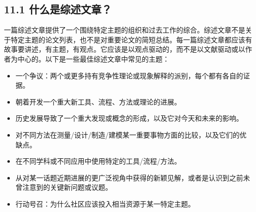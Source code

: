 \subsection*{11.1 什么是综述文章？}
一篇综述文章提供了一个围绕特定主题的组织和过去工作的综合。综述文章不是关于特定主题的论文列表，也不是对重要论文的简短总结。每一篇综述文章都应该有故事要讲述，有主题，有观点。它应该是以观点驱动的，而不是以文献驱动或以作者为中心的。以下是一些最佳综述文章中常见的主题：

\begin{itemize}
\item 一个争议：两个或更多持有竞争性理论或现象解释的派别，每个都有各自的证据。
\item 朝着开发一个重大新工具、流程、方法或理论的进展。
\item 历史发展导致了一个重大发现或概念的形成，以及它对今天和未来的影响。
\item 对不同方法在测量/设计/制造/建模某一重要事物方面的比较，以及它们的优缺点。
\item 在不同学科或不同应用中使用特定的工具/流程/方法。
\item 从对某一话题近期进展的更广泛视角中获得的新颖见解，或者是认识到之前未曾注意到的关键新问题或议题。
\item 行动号召：为什么社区应该投入相当资源于某一特定主题。
\end{itemize}

